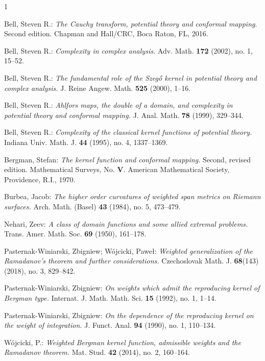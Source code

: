 \documentclass[11pt, reqno]{amsart}
\numberwithin{equation}{section}
\begin{document}
\begin{thebibliography}{1}

Bell, Steven R.: \textit{The Cauchy transform, potential theory and conformal mapping}. Second edition. Chapman and Hall/CRC, Boca Raton, FL, 2016.

Bell, Steven R.: \textit{Complexity in complex analysis.}
Adv. Math. \textbf{172} (2002), no. 1, 15–52.

Bell, Steven R.: \textit{The fundamental role of the Szegő kernel in potential theory and complex analysis.}
J. Reine Angew. Math. \textbf{525} (2000), 1–16. 

Bell, Steven R.: \textit{Ahlfors maps, the double of a domain, and complexity in potential theory and conformal mapping.}
J. Anal. Math. \textbf{78} (1999), 329–344. 

Bell, Steven R.:  \textit{Complexity of the classical kernel functions of potential theory.}
Indiana Univ. Math. J. \textbf{44} (1995), no. 4, 1337–1369.
	
Bergman, Stefan: \textit{The kernel function and conformal mapping.}
Second, revised edition. Mathematical Surveys, No. \textbf{V}. American Mathematical Society, Providence, R.I., 1970.

Burbea, Jacob: \textit{The higher order curvatures of weighted span metrics on Riemann surfaces.}
Arch. Math. (Basel) \textbf{43} (1984), no. 5, 473–479. 

Nehari, Zeev: \textit{A class of domain functions and some allied extremal problems.} 
Trans. Amer. Math. Soc. \textbf{69} (1950), 161–178.

Pasternak-Winiarski, Zbigniew; Wójcicki, Paweł: \textit{Weighted generalization of the Ramadanov's theorem and further considerations.}
Czechoslovak Math. J. \textbf{68}(143) (2018), no. 3, 829–842. 

Pasternak-Winiarski, Zbigniew: \textit{On weights which admit the reproducing kernel of Bergman type.}
Internat. J. Math. Math. Sci. \textbf{15} (1992), no. 1, 1–14.

Pasternak-Winiarski, Zbigniew: \textit{On the dependence of the reproducing kernel on the weight of integration.}
J. Funct. Anal. \textbf{94} (1990), no. 1, 110–134. 

Wójcicki, P.: \textit{Weighted Bergman kernel function, admissible weights and the Ramadanov theorem.}
Mat. Stud. \textbf{42} (2014), no. 2, 160–164.

\end{thebibliography}
\end{document}
